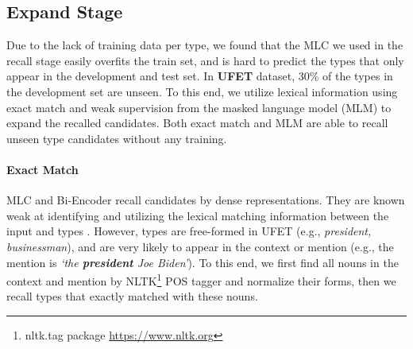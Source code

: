\subsection{Expand Stage}
Due to the lack of training data per type, we found that the MLC we used in the recall stage easily overfits the train set, and is hard to predict the types that only appear in the development and test set. In {\bf \textsc{UFET}} dataset, 30\% of the types in the development set are unseen. To this end, we utilize lexical information using exact match and weak supervision from the masked language model (MLM) to expand the recalled candidates. Both exact match and MLM are able to recall unseen type candidates without any training. 
\paragraph{Exact Match} MLC and Bi-Encoder recall candidates by dense representations. They are known weak at identifying and utilizing the lexical matching information between the input and types \cite{matching_info1, matching_info2}. However, 
 types are free-formed in UFET (e.g., \textit{president, businessman}), and are very likely to appear in the context or mention (e.g., the mention is \textit{`the \textbf{president} Joe Biden'}). To this end, we first find all nouns in the context and mention by NLTK\footnote{nltk.tag package \url{https://www.nltk.org}} POS tagger and normalize their forms, then we recall types that exactly matched with these nouns.
